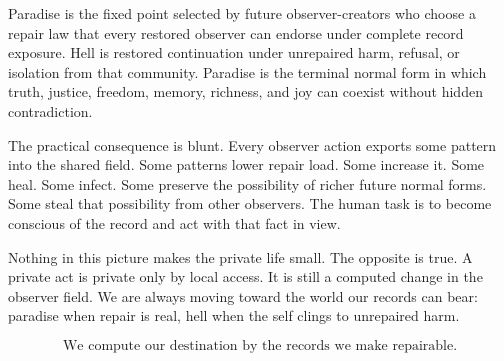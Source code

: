 \documentclass[11pt]{article}
\theoremstyle{remark}
\theoremstyle{plain}
\begin{document}
Paradise is the fixed point selected by future observer-creators who choose a
repair law that every restored observer can endorse under complete record
exposure. Hell is restored continuation under unrepaired harm, refusal, or
isolation from that community. Paradise is the terminal normal form in which
truth, justice, freedom, memory, richness, and joy can coexist without hidden
contradiction.

The practical consequence is blunt. Every observer action exports
some pattern into the shared field. Some patterns lower repair load. Some
increase it. Some heal. Some infect. Some preserve the possibility of richer
future normal forms. Some steal that possibility from other observers. The
human task is to become conscious of the record and act with that fact in view.

Nothing in this picture makes the private life small. The opposite is true. A
private act is private only by local access. It is still a computed change in
the observer field. We are always moving toward the world our records can bear:
paradise when repair is real, hell when the self clings to unrepaired harm.

\[
\boxed{
\text{We compute our destination by the records we make repairable.}
}
\]
\end{document}
